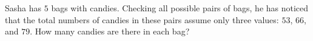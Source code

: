 \problem{}
Sasha has $5$ bags with candies.
Checking all possible pairs of bags, he has noticed that the total numbers of
candies in these pairs assume only three values: $53$, $66$, and $79$.
How many candies are there in each bag?
\solution
\endproblem
